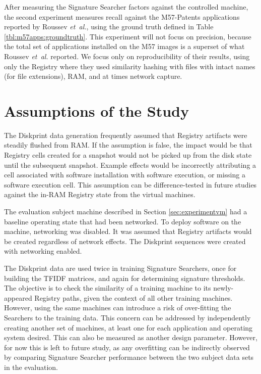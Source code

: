 \documentclass[11pt]{ucthesis}
\theoremstyle{plain}
\theoremstyle{definition}
\newcommand{\etal}{\emph{et~al.}\xspace}
\begin{document}
After measuring the Signature Searcher factors against the controlled machine, the second experiment measures recall against the M57-Patents applications reported by Roussev \etal, using the ground truth defined in Table \ref{tbl:m57apps:groundtruth}.  This experiment will not focus on precision, because the total set of applications installed on the M57 images is a superset of what Roussev \etal reported.  We focus only on reproducibility of their results, using only the Registry where they used similarity hashing with files with intact names (for file extensions), RAM, and at times network capture.


\section{Assumptions of the Study}

The Diskprint data generation frequently assumed that Registry artifacts were steadily flushed from RAM.  If the assumption is false, the impact would be that Registry cells created for a snapshot would not be picked up from the disk state until the subsequent snapshot.  Example effects would be incorrectly attributing a cell associated with software installation with software execution, or missing a software execution cell.  This assumption can be difference-tested in future studies against the in-RAM Registry state from the virtual machines.

The evaluation subject machine described in Section \ref{sec:experimentvm} had a baseline operating state that had been networked.  To deploy software on the machine, networking was disabled.  It was assumed that Registry artifacts would be created regardless of network effects.  The Diskprint sequences were created with networking enabled.

The Diskprint data are used twice in training Signature Searchers, once for building the TFIDF matrices, and again for determining signature thresholds.  The objective is to check the similarity of a training machine to its newly-appeared Registry paths, given the context of all other training machines.  However, using the same machines can introduce a risk of over-fitting the Searchers to the training data.  This concern can be addressed by independently creating another set of machines, at least one for each application and operating system desired.  This can also be measured as another design parameter.  However, for now this is left to future study, as any overfitting can be indirectly observed by comparing Signature Searcher performance between the two subject data sets in the evaluation.
\end{document}

